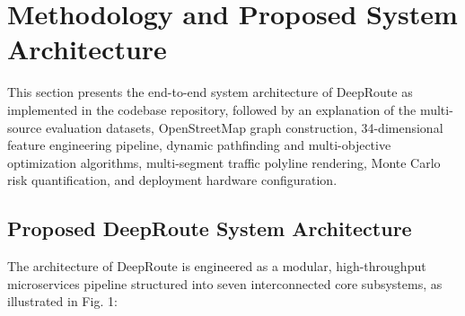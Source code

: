 \documentclass[journal]{IEEEtran}
\begin{document}
\section{Methodology and Proposed System Architecture}
This section presents the end-to-end system architecture of DeepRoute as implemented in the codebase repository, followed by an explanation of the multi-source evaluation datasets, OpenStreetMap graph construction, 34-dimensional feature engineering pipeline, dynamic pathfinding and multi-objective optimization algorithms, multi-segment traffic polyline rendering, Monte Carlo risk quantification, and deployment hardware configuration.

\subsection{Proposed DeepRoute System Architecture}
The architecture of DeepRoute is engineered as a modular, high-throughput microservices pipeline structured into seven interconnected core subsystems, as illustrated in Fig. 1:
\end{document}
